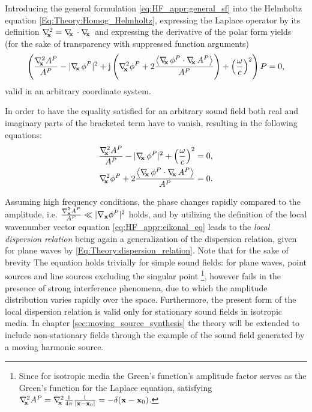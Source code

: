 Introducing the general formulation \eqref{eq:HF_appr:general_sf} into the Helmholtz equation \eqref{Eq:Theory:Homog_Helmholtz}, expressing the Laplace operator by its definition $\nabla^2_{\!\!\mathbf{x}} = \nabla_{\!\!\mathbf{x}}\, \cdot \nabla_{\!\!\mathbf{x}}\,$ and expressing the derivative of the polar form yields (for the sake of transparency with suppressed function arguments)
\begin{equation}
\left( 
\frac{\Lx A^P}{A^P} 
- 
| \Dx \phi^P |^2
+ 
\ti \left(  
\Lx \phi^P
+ 2\frac{ \left< \Dx \phi^P \cdot \Dx A^P \right> }{A^P} 
\right)
+ \left(\frac{\omega}{c}\right)^2 
\right) 
P = 0,
\label{eq:HF_appr:ray_tracing_helmholtz}
\end{equation}
valid in an arbitrary coordinate system.

In order to have the equality satisfied for an arbitrary sound field both real and imaginary parts of the bracketed term have to vanish, resulting in the following equations:
\begin{eqnarray} \label{eq:HF_appr:eikonal_eq}
\frac{\Lx A^P}{A^P}  - | \Dx \phi^P |^2 + \left(\frac{\omega}{c}\right)^2 = 0, \\ 
\label{eq:HF_appr:transport_eq}
\Lx \phi^P + 2\frac{ \left< \Dx \phi^P \cdot \Dx A^P \right> }{A^P} = 0.
\end{eqnarray}

Assuming high frequency conditions, the phase changes rapidly compared to the amplitude, i.e. $\frac{\nabla^2_{\mathbf{x}} A^P}{A^P} \ll | \nabla_{\mathbf{x}} \phi^P |^2$ holds, 
and by utilizing the definition of the local wavenumber vector equation \eqref{eq:HF_appr:eikonal_eq} leads to the \emph{local dispersion relation}
being again a generalization of the dispersion relation, given for plane waves by \eqref{Eq:Theory:dispersion_relation}.
%
Note that for the sake of brevity 
The equation holds trivially for simple sound fields: for plane waves, point sources and line sources excluding the singular point \footnote{Since for isotropic media the Green's function's amplitude factor serves as the Green's function for the Laplace equation, satisfying $\nabla^2_{\!\!\mathbf{x}} A^P = \nabla^2_{\!\!\mathbf{x}} \frac{1}{4\pi} \frac{1}{|\mathbf{x}-\mathbf{x}_0|} = -\delta(\mathbf{x}-\mathbf{x}_0)$.}, however fails in the presence of strong interference phenomena, due to which the amplitude distribution varies rapidly over the space.
Furthermore, the present form of the local dispersion relation is valid only for stationary sound fields in isotropic media.
In chapter \ref{sec:moving_source_synthesis} the theory will be extended to include non-stationary fields through the example of the sound field generated by a moving harmonic source.

